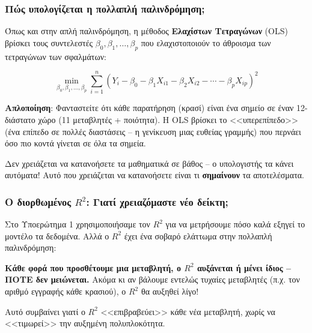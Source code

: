 \documentclass[12pt,a4paper]{article}
\begin{document}
\subsubsection{Πώς υπολογίζεται η πολλαπλή παλινδρόμηση;}

\begin{theorybox}
Όπως και στην απλή παλινδρόμηση, η μέθοδος \textbf{Ελαχίστων Τετραγώνων} (OLS) βρίσκει τους συντελεστές $\beta_0, \beta_1, \ldots, \beta_p$ που ελαχιστοποιούν το άθροισμα των τετραγώνων των σφαλμάτων:

\begin{equation}
\min_{\beta_0, \beta_1, \ldots, \beta_p} \sum_{i=1}^{n} \left(Y_i - \beta_0 - \beta_1 X_{i1} - \beta_2 X_{i2} - \cdots - \beta_p X_{ip}\right)^2
\end{equation}

\textbf{Απλοποίηση}: Φανταστείτε ότι κάθε παρατήρηση (κρασί) είναι ένα σημείο σε έναν 12-διάστατο χώρο (11 μεταβλητές + ποιότητα). Η OLS βρίσκει το <<υπερεπίπεδο>> (ένα επίπεδο σε πολλές διαστάσεις -- η γενίκευση μιας ευθείας γραμμής) που περνάει όσο πιο κοντά γίνεται σε όλα τα σημεία.

Δεν χρειάζεται να κατανοήσετε τα μαθηματικά σε βάθος -- ο υπολογιστής τα κάνει αυτόματα! Αυτό που χρειάζεται να κατανοήσετε είναι τι \textbf{σημαίνουν} τα αποτελέσματα.
\end{theorybox}

\subsubsection{Ο διορθωμένος $R^2$: Γιατί χρειαζόμαστε νέο δείκτη;}

\begin{theorybox}[title={Πρόβλημα: Ο $R^2$ είναι <<αισιόδοξος>>!}]
Στο Υποερώτημα 1 χρησιμοποιήσαμε τον $R^2$ για να μετρήσουμε πόσο καλά εξηγεί το μοντέλο τα δεδομένα. Αλλά ο $R^2$ έχει ένα σοβαρό ελάττωμα στην πολλαπλή παλινδρόμηση:

\textbf{Κάθε φορά που προσθέτουμε μια μεταβλητή, ο $R^2$ αυξάνεται ή μένει ίδιος -- ΠΟΤΕ δεν μειώνεται.} Ακόμα κι αν βάλουμε εντελώς τυχαίες μεταβλητές (π.χ. τον αριθμό εγγραφής κάθε κρασιού), ο $R^2$ θα αυξηθεί λίγο!

Αυτό συμβαίνει γιατί ο $R^2$ <<επιβραβεύει>> κάθε νέα μεταβλητή, χωρίς να <<τιμωρεί>> την αυξημένη πολυπλοκότητα.
\end{theorybox}
\end{document}
